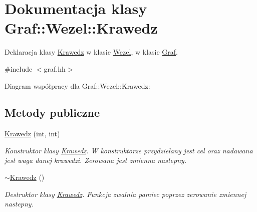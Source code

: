 \hypertarget{class_graf_1_1_wezel_1_1_krawedz}{\section{\-Dokumentacja klasy \-Graf\-:\-:\-Wezel\-:\-:\-Krawedz}
\label{class_graf_1_1_wezel_1_1_krawedz}
}


\-Deklaracja klasy \hyperlink{class_graf_1_1_wezel_1_1_krawedz}{\-Krawedz} w klasie \hyperlink{class_graf_1_1_wezel}{\-Wezel}, w klasie \hyperlink{class_graf}{\-Graf}.  




{\ttfamily \#include $<$graf.\-hh$>$}



\-Diagram współpracy dla \-Graf\-:\-:\-Wezel\-:\-:\-Krawedz\-:
\subsection*{\-Metody publiczne}
\begin{DoxyCompactItemize}
\item 
\hyperlink{class_graf_1_1_wezel_1_1_krawedz_acac35eaefe63cdd45a4c431c52af8cab}{\-Krawedz} (int, int)
\begin{DoxyCompactList}\small\item\em \-Konstruktor klasy \hyperlink{class_graf_1_1_wezel_1_1_krawedz}{\-Krawedz}. \-W konstruktorze przydzielany jest cel oraz nadawana jest waga danej krawedzi. \-Zerowana jest zmienna nastepny. \end{DoxyCompactList}\item 
\hyperlink{class_graf_1_1_wezel_1_1_krawedz_ae118e5d8d2e947f55f4df1d12da18877}{$\sim$\-Krawedz} ()
\begin{DoxyCompactList}\small\item\em \-Destruktor klasy \hyperlink{class_graf_1_1_wezel_1_1_krawedz}{\-Krawedz}. \-Funkcja zwalnia pamiec poprzez zerowanie zmiennej nastepny. \end{DoxyCompactList}\end{DoxyCompactItemize}
